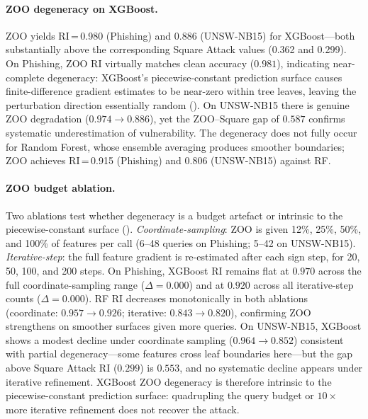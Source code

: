 \documentclass[runningheads]{llncs}
\begin{document}
\paragraph{ZOO degeneracy on XGBoost.}
ZOO yields RI\,=\,0.980 (Phishing) and 0.886 (UNSW-NB15) for XGBoost---both
substantially above the corresponding Square Attack values (0.362 and 0.299).
On Phishing, ZOO RI virtually matches clean accuracy ($0.981$), indicating
near-complete degeneracy: XGBoost's piecewise-constant prediction surface causes
finite-difference gradient estimates to be near-zero within tree leaves, leaving
the perturbation direction essentially random ().  On
UNSW-NB15 there is genuine ZOO degradation ($0.974 \to 0.886$), yet the
ZOO--Square gap of $0.587$ confirms systematic underestimation of vulnerability.
The degeneracy does not fully occur for Random Forest, whose ensemble averaging
produces smoother boundaries; ZOO achieves RI\,=\,0.915 (Phishing) and 0.806
(UNSW-NB15) against RF.

\paragraph{ZOO budget ablation.}
Two ablations test whether degeneracy is a budget artefact or intrinsic to the
piecewise-constant surface ().
\emph{Coordinate-sampling}: ZOO is given 12\%, 25\%, 50\%, and 100\% of
features per call (6--48 queries on Phishing; 5--42 on UNSW-NB15).
\emph{Iterative-step}: the full feature gradient is re-estimated after each
sign step, for 20, 50, 100, and 200 steps.
On Phishing, XGBoost RI remains flat at $0.970$ across the full
coordinate-sampling range ($\Delta = 0.000$) and at $0.920$ across all
iterative-step counts ($\Delta = 0.000$).  RF RI decreases monotonically in
both ablations (coordinate: $0.957 \to 0.926$; iterative: $0.843 \to 0.820$),
confirming ZOO strengthens on smoother surfaces given more queries.
On UNSW-NB15, XGBoost shows a modest decline under coordinate sampling
($0.964 \to 0.852$) consistent with partial degeneracy---some features cross
leaf boundaries here---but the gap above Square Attack RI ($0.299$) is $0.553$,
and no systematic decline appears under iterative refinement.  XGBoost ZOO
degeneracy is therefore intrinsic to the piecewise-constant prediction surface:
quadrupling the query budget or $10\times$ more iterative refinement does not
recover the attack.
\end{document}
